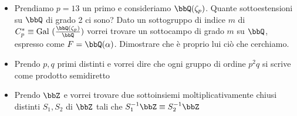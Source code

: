 \documentclass[a4paper,11pt,NoNotes,GeneralMath]{stdmdoc}
\newcommand{\Gal}{\text{Gal }}
\begin{document}
\begin{itemize}
        \item Prendiamo $p=13$ un primo e consideriamo $\bbQ(\zeta_p)$. Quante sottoestensioni su $\bbQ$ di grado 2 ci sono? Dato un sottogruppo di indice $m$ di $C_p^{*} \equiv \Gal(\frac{\bbQ(\zeta_p)}{\bbQ})$ vorrei trovare un sottocampo di grado $m$ su $\bbQ$, espresso come $F = \bbQ(\alpha)$. Dimostrare che è proprio lui ciò che cerchiamo.
        \item Prendo $p, q$ primi distinti e vorrei dire che ogni gruppo di ordine $p^2 q$ si scrive come prodotto semidiretto
        \item Prendo $\bbZ$ e vorrei trovare due sottoinsiemi moltiplicativamente chiusi distinti $S_1, S_2$ di $\bbZ$ tali che $S_1^{-1} \bbZ \equiv S_2^{-1} \bbZ$
    \end{itemize}
    
\end{document}
